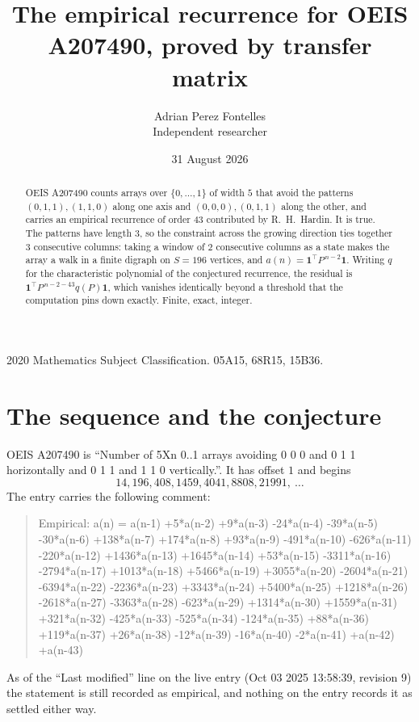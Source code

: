 \documentclass[11pt,a4paper]{article}
\title{The empirical recurrence for OEIS A207490, proved by transfer matrix}
\author{Adrian Perez Fontelles\\ \small Independent researcher}
\date{31 August 2026}
\theoremstyle{plain}
\theoremstyle{definition}
\begin{document}
\maketitle

\begin{abstract}
OEIS A207490 counts arrays over $\{0,\dots,1\}$ of width $5$ that avoid the patterns
$(0,1,1), (1,1,0)$ along one axis and $(0,0,0), (0,1,1)$ along the other, and carries an empirical recurrence of
order $43$ contributed by R.~H.~Hardin. It is true. The patterns have length $3$, so
the constraint across the growing direction ties together $3$ consecutive columns: taking a
window of $2$ consecutive columns as a state makes the array a walk in a finite digraph
on $S=196$ vertices, and $a(n)=\mathbf{1}^{\!\top}P^{\,n-2}\mathbf{1}$. Writing $q$
for the characteristic polynomial of the conjectured recurrence, the residual is
$\mathbf{1}^{\!\top}P^{\,n-2-43}q(P)\mathbf{1}$, which vanishes identically
beyond a threshold that the computation pins down exactly. Finite, exact, integer.
\end{abstract}

\noindent\small 2020 Mathematics Subject Classification. 05A15, 68R15, 15B36.\normalsize

\section{The sequence and the conjecture}

OEIS A207490 is ``Number of 5Xn 0..1 arrays avoiding 0 0 0 and 0 1 1 horizontally and 0 1 1 and 1 1 0 vertically.''. It has offset
$1$ and begins
\[
14, 196, 408, 1459, 4041, 8808, 21991,\ \dots
\]
The entry carries the following comment:
\begin{quote}\small
Empirical: a(n) = a(n-1) +5*a(n-2) +9*a(n-3) -24*a(n-4) -39*a(n-5) -30*a(n-6) +138*a(n-7) +174*a(n-8) +93*a(n-9) -491*a(n-10) -626*a(n-11) -220*a(n-12) +1436*a(n-13) +1645*a(n-14) +53*a(n-15) -3311*a(n-16) -2794*a(n-17) +1013*a(n-18) +5466*a(n-19) +3055*a(n-20) -2604*a(n-21) -6394*a(n-22) -2236*a(n-23) +3343*a(n-24) +5400*a(n-25) +1218*a(n-26) -2618*a(n-27) -3363*a(n-28) -623*a(n-29) +1314*a(n-30) +1559*a(n-31) +321*a(n-32) -425*a(n-33) -525*a(n-34) -124*a(n-35) +88*a(n-36) +119*a(n-37) +26*a(n-38) -12*a(n-39) -16*a(n-40) -2*a(n-41) +a(n-42) +a(n-43)
\end{quote}
As of the ``Last modified'' line on the live entry (Oct 03 2025 13:58:39, revision
9) the statement is still recorded as empirical, and nothing on the entry
records it as settled either way.
\end{document}
